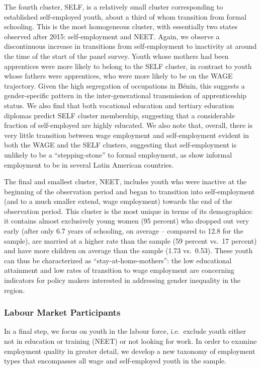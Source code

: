 \documentclass[
  a4paper, twoside, 12pt]{book}
\begin{document}
The fourth cluster, SELF, is a relatively small cluster corresponding to established self-employed youth, about a third of whom transition from formal schooling. This is the most homogeneous cluster, with essentially two states observed after 2015: self-employment and NEET. Again, we observe a discontinuous increase in transitions from self-employment to inactivity at around the time of the start of the panel survey. Youth whose mothers had been apprentices were more likely to belong to the SELF cluster, in contrast to youth whose fathers were apprentices, who were more likely to be on the WAGE trajectory. Given the high segregation of occupations in Bénin, this suggests a gender-specific pattern in the inter-generational transmission of apprenticeship status. We also find that both vocational education and tertiary education diplomas predict SELF cluster membership, suggesting that a considerable fraction of self-employed are highly educated. We also note that, overall, there is very little transition between wage employment and self-employment evident in both the WAGE and the SELF clusters, suggesting that self-employment is unlikely to be a ``stepping-stone'' to formal employment, as \textcite{cunningham2011} show informal employment to be in several Latin American countries.

The final and smallest cluster, NEET, includes youth who were inactive at the beginning of the observation period and began to transition into self-employment (and to a much smaller extend, wage employment) towards the end of the observation period. This cluster is the most unique in terms of its demographics: it contains almost exclusively young women (95 percent) who dropped out very early (after only 6.7 years of schooling, on average -- compared to 12.8 for the sample), are married at a higher rate than the sample (59 percent vs.~17 percent) and have more children on average than the sample (1.73 vs.~0.53). These youth can thus be characterized as ``stay-at-home-mothers'': the low educational attainment and low rates of transition to wage employment are concerning indicators for policy makers interested in addressing gender inequality in the region.

\hypertarget{labour-market-participants}{%
\subsubsection*{Labour Market Participants}\label{labour-market-participants}}

In a final step, we focus on youth in the labour force, i.e.~exclude youth either not in education or training (NEET) or not looking for work. In order to examine employment quality in greater detail, we develop a new taxonomy of employment types that encompasses all wage and self-employed youth in the sample.
\end{document}

